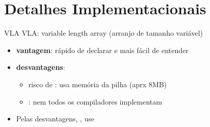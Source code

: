 \documentclass[portuguese,10pt,xcolor=table]{bredelebeamer}
\begin{document}
		\section{Detalhes Implementacionais}
		
		\begin{frame}[c]
			\begin{center}
				\structure{\large \insertsection}
			\end{center}
		\end{frame} 

		\begin{frame}{VLA} 
		 VLA: variable length array (arranjo de tamanho variável)
			
			\begin{itemize}
				\item \textbf{vantagem}: rápido de declarar e mais fácil de entender
				\item  \textbf{desvantagens}: 
					\begin{itemize}
						\item risco de : usa memória da pilha (aprx 8MB)
						\item {}: nem todos os compiladores implementam
					\end{itemize}
				\item 	\bcattention Pelas desvantagens, , use 
			\end{itemize}
		\end{frame}
\end{document}
